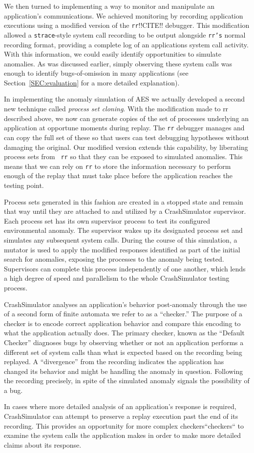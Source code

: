 We then turned to implementing a way to monitor and manipulate an
application's communications.  We achieved monitoring by
recording application executions
using a modified version of the {\tt rr}!!CITE!!
debugger.  This modification allowed
a {\tt strace}-style
system call recording to be output alongside {\tt rr's} normal recording
format, providing
a complete log of an applications system call activity.
With this information, we could
easily identify opportunities to simulate anomalies.  As was
discussed earlier, simply observing these system calls was enough to
identify bugs-of-omission in many applications
(see Section~\ref{SEC:evaluation} for a more detailed explanation).

In implementing the anomaly simulation of AES
we actually developed
a second new technique
called {\it process set cloning}.
With the modification made to rr described above,
we now can generate copies of the set of
processes underlying an application at opportune moments during replay.
The {\tt rr} debugger manages
and can copy
the full set of these
so that users can test debugging
hypotheses without damaging the original.
Our modified version
extends this capability, by liberating process sets from {\tt
rr} so that they can be exposed to simulated anomalies.
This means that we can rely on {\tt rr}
to store the information necessary to perform enough of the
replay that must take place before the application reaches the
testing point.

Process sets generated in this fashion are created in a stopped state and
remain that way until they are attached to and utilized by a CrashSimulator
supervisor.  Each process set has its own supervisor process to test
its configured environmental anomaly.  The
supervisor wakes up its designated process set
and simulates any
subsequent system calls.
During the course of this simulation, a mutator is used to
apply the modified responses identified
as part of the initial search for anomalies,
exposing the processes to the
anomaly being tested.
Supervisors can complete this
process independently of one another, which lends a
high degree of speed and
parallelism to the whole CrashSimulator testing process.

CrashSimulator analyses an application's behavior post-anomaly through the
use of a second form of finite automata we refer to as a ``checker.''  The
purpose of a checker is to encode correct application behavior and compare
this encoding to what the application actually does.
The primary checker, known as the ``Default Checker''
diagnoses bugs
by observing whether or not an application
performs a different set of system calls than what is expected based on the
recording being replayed.  A ``divergence'' from the recording indicates
the application has changed its behavior and might be handling
the anomaly in question.  Following the recording precisely, in spite of
the simulated anomaly signals the possibility of a bug.

In cases where more detailed analysis of an application's response
is required, CrashSimulator can attempt to preserve a replay execution
past the end of its recording.  This provides an opportunity for
more complex checkers``checkers`` to examine
the system calls the application makes in order to make more detailed claims about
its response.
